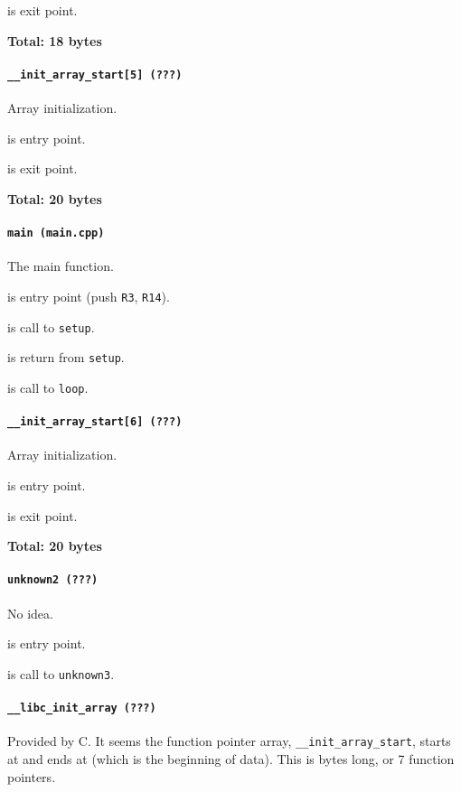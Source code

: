  is exit point.

\textbf{Total: 18 bytes}

\paragraph{\texttt{\_\_init\_array\_start[5] (???)}} Array initialization.

 is entry point.

 is exit point.

\textbf{Total: 20 bytes}

\paragraph{\texttt{main (main.cpp)}} The main function.

 is entry point (push \texttt{R3}, \texttt{R14}).

 is call to \texttt{setup}.

 is return from \texttt{setup}.

 is call to \texttt{loop}.

\paragraph{\texttt{\_\_init\_array\_start[6] (???)}} Array initialization.

 is entry point.

 is exit point.

\textbf{Total: 20 bytes}

\paragraph{\texttt{unknown2 (???)}} No idea.

 is entry point.

 is call to \texttt{unknown3}.

\paragraph{\texttt{\_\_libc\_init\_array (???)}} Provided by C. It seems the
function pointer array,  \texttt{\_\_init\_array\_start}, starts at
 and ends at  (which is the beginning of
data). This is  bytes long, or 7 function pointers.

